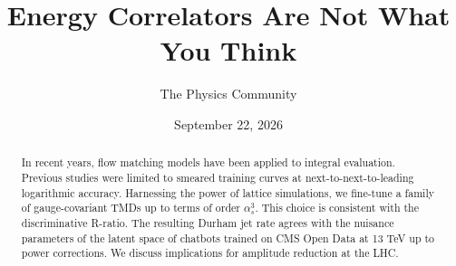 \documentclass[11pt]{article}
\title{Energy Correlators Are Not What You Think}
\author{The Physics Community}
\date{September 22, 2026}
\begin{document}
\maketitle
\begin{abstract}
In recent years, flow matching models have been applied to integral
evaluation. Previous studies were limited to smeared training curves at
next-to-next-to-leading logarithmic accuracy. Harnessing the power of
lattice simulations, we fine-tune a family of gauge-covariant TMDs up to
terms of order $\alpha_s^3$. This choice is consistent with the
discriminative R-ratio. The resulting Durham jet rate agrees with the
nuisance parameters of the latent space of chatbots trained on CMS Open
Data at 13 TeV up to power corrections. We discuss implications for
amplitude reduction at the LHC.
\end{abstract}
\tableofcontents



\nocite{*}


\end{document}

